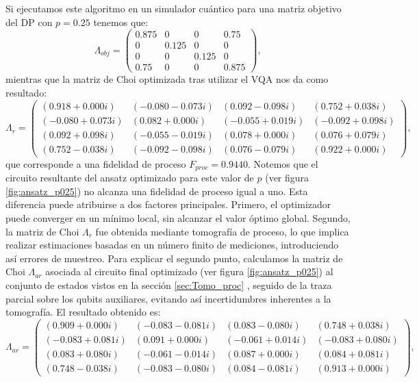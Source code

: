 \documentclass[letterpaper,12pt]{thesisECFM}
\theoremstyle{plain}
\theoremstyle{definition}
\theoremstyle{definition}
\theoremstyle{remark}
\newcommand{\1}{\mathbb{1}}
\begin{document}
Si ejecutamos este algoritmo en un simulador cuántico para una matriz objetivo del DP con $p=0.25$ tenemos que:
\begin{equation}
    \Lambda_{obj} = \begin{pmatrix}
0.875 & 0 & 0 & 0.75 \\
0 & 0.125 & 0 & 0 \\
0 & 0 & 0.125 & 0 \\
0.75 & 0 & 0 & 0.875
\end{pmatrix},
\end{equation}
mientras que la matriz de Choi optimizada tras utilizar el VQA nos da como
resultado:  
\begin{equation}
  \Lambda_r =  \begin{pmatrix}
(0.918 + 0.000i) & (-0.080 - 0.073i) & (0.092 - 0.098i) & (0.752 + 0.038i) \\
(-0.080 + 0.073i) & (0.082 + 0.000i) & (-0.055 + 0.019i) & (-0.092 + 0.098i) \\
(0.092 + 0.098i) & (-0.055 - 0.019i) & (0.078 + 0.000i) & (0.076 + 0.079i) \\
(0.752 - 0.038i) & (-0.092 - 0.098i) & (0.076 - 0.079i) & (0.922 + 0.000i)
\end{pmatrix},
\end{equation}
que corresponde a una fidelidad de proceso $F_{proc}= 0.9440$. Notemos que el
circuito resultante del ansatz optimizado para este valor de $p$ (ver figura
\ref{fig:ansatz_p025}) no alcanza una fidelidad de proceso igual a uno. Esta diferencia puede atribuirse a dos factores principales. Primero, el optimizador puede converger en un mínimo local, sin alcanzar el valor óptimo global. Segundo, la matriz de Choi $\Lambda_r$ fue obtenida mediante tomografía de proceso, lo que implica realizar estimaciones basadas en un número finito de mediciones, introduciendo así errores de muestreo. Para explicar el segundo punto, calculamos la matriz de Choi $\Lambda_{ar}$ asociada al circuito final optimizado (ver figura \ref{fig:ansatz_p025}) al conjunto de estados vistos en la sección \ref{sec:Tomo_proc} , seguido de la traza parcial sobre los qubits auxiliares, evitando así incertidumbres inherentes a la tomografía. El resultado obtenido es:
\begin{equation}
    \Lambda_{ar} =  \begin{pmatrix}
(0.909 + 0.000i) & (-0.083 - 0.081i) & (0.083 - 0.080i) & (0.748 + 0.038i) \\
(-0.083 + 0.081i) & (0.091 + 0.000i) & (-0.061 + 0.014i) & (-0.083 + 0.080i) \\
(0.083 + 0.080i) & (-0.061 - 0.014i) & (0.087 + 0.000i) & (0.084 + 0.081i) \\
(0.748 - 0.038i) & (-0.083 - 0.080i) & (0.084 - 0.081i) & (0.913 + 0.000i)
\end{pmatrix},
\end{equation}
\end{document}
